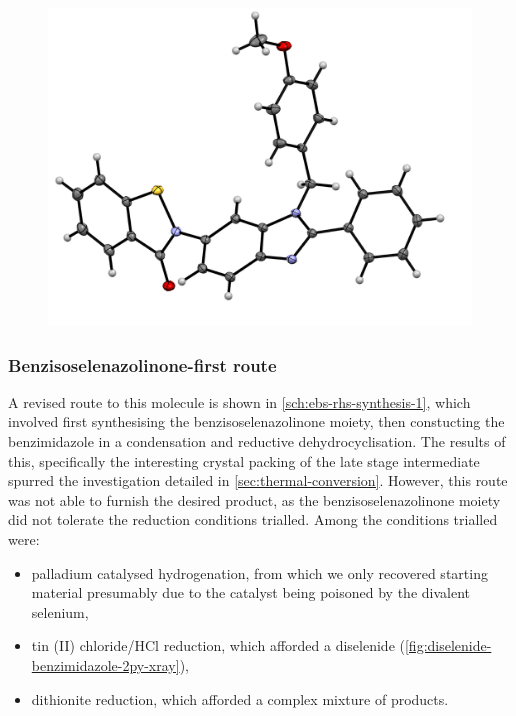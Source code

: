 \begin{refsection}
\begin{figure}
    \includegraphics[width = 0.8\linewidth]{Figures/ebs-thio-rhs-pmb-xray.pdf}
    \caption{}
    \label{fig:ebs-thio-rhs-pmb-xray}
\end{figure}


\subsubsection{Benzisoselenazolinone-first route}

A revised route to this molecule is shown in \cref{sch:ebs-rhs-synthesis-1}, which involved first synthesising the benzisoselenazolinone moiety, then constucting the benzimidazole in a condensation and reductive dehydrocyclisation.
The results of this, specifically the interesting crystal packing of the late stage intermediate  spurred the investigation detailed in \cref{sec:thermal-conversion}.
However, this route was not able to furnish the desired product, as the benzisoselenazolinone moiety did not tolerate the reduction conditions trialled.
Among the conditions trialled were:
\begin{itemize}
    \item palladium catalysed hydrogenation, from which we only recovered starting material presumably due to the catalyst being poisoned by the divalent selenium,
    \item tin (II) chloride/HCl reduction, which afforded a diselenide  (\cref{fig:diselenide-benzimidazole-2py-xray}),
    \item dithionite reduction, which afforded a complex mixture of products.
    \label{sec:reduction}
\end{itemize}


\end{refsection}
